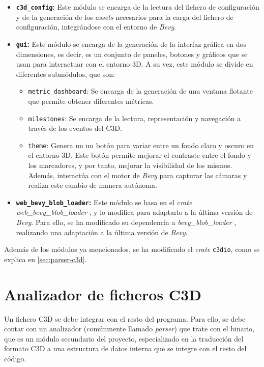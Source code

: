 \begin{itemize}
    \item \textbf{\texttt{c3d\_config}:} Este módulo se encarga de la lectura del fichero de configuración y de la generación de los \textit{assets} necesarios para la carga del fichero de configuración, integrándose con el entorno de \textit{Bevy}.
    \item \textbf{\texttt{gui}:} Este módulo se encarga de la generación de la interfaz gráfica en dos dimensiones, es decir, es un conjunto de paneles, botones y gráficos que se usan para interactuar con el entorno 3D. A su vez, este módulo se divide en diferentes submódulos, que son:
    \begin{itemize}
        \item \texttt{metric\_dashboard}: Se encarga de la generación de una ventana flotante que permite obtener diferentes métricas.
        \item \texttt{milestones}: Se encarga de la lectura, representación y navegación a través de los eventos del \ac{C3D}.
        \item \texttt{theme}: Genera un un botón para variar entre un fondo claro y oscuro en el entorno 3D. Este botón permite mejorar el contraste entre el fondo y los marcadores, y por tanto, mejorar la visibilidad de los mismos. Además, interactúa con el motor de \textit{Bevy} para capturar las cámaras y realiza este cambio de manera autónoma.
    \end{itemize}
    \item \textbf{\texttt{web\_bevy\_blob\_loader}:} Este módulo se basa en el \textit{crate} \textit{web\_bevy\_blob\_loader} \autocite{kayhKayhhhBevy_web_file_drop2024}, y lo modifica para adaptarlo a la última versión de \textit{Bevy}. Para ello, se ha modificado su dependencia a \textit{bevy\_blob\_loader} \autocite{kayhKayhhhBevy_blob_loader2024}, realizando una adaptación a la última versión de \textit{Bevy}.
\end{itemize}

Además de los módulos ya mencionados, se ha modificado el \textit{crate} \texttt{c3dio}, como se explica en \autoref{sec:parser-c3d}.

\section{Analizador de ficheros \acs{C3D}} \label{sec:parser-c3d}
Un fichero \ac{C3D} se debe integrar con el resto del programa. Para ello, se debe contar con un analizador (comúnmente llamado \textit{parser}) que trate con el binario, que es un módulo secundario del proyecto, especializado en la traducción del formato \ac{C3D} a una estructura de datos interna que se integre con el resto del código.

